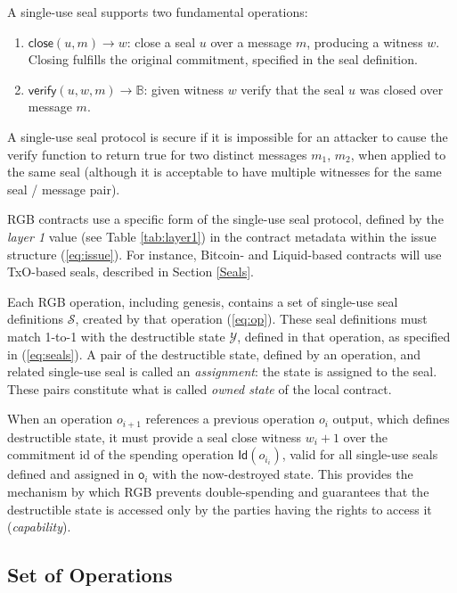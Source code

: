 \documentclass[9pt,oneside]{amsart}
\begin{document}
\begin{multicols}{2}
A single-use seal supports two fundamental operations:
\begin{enumerate}
    \item $\mathsf{close}(u,m) \rightarrow w$: close a seal $u$ over a message $m$, producing a witness $w$.
    Closing fulfills the original commitment, specified in the seal definition.
    \item $\mathsf{verify}(u,w,m) \rightarrow \mathbb{B}$: 
    given witness $w$ verify that the seal $u$ was closed over message $m$.
\end{enumerate}

A single-use seal protocol is secure if it is impossible for an attacker
to cause the \textsf{verify} function to return \textsf{true}
for two distinct messages $m_1$, $m_2$, when applied to the same seal
(although it is acceptable to have multiple witnesses for the same seal / message pair).

RGB contracts use a specific form of the single-use seal protocol,
defined by the \emph{layer 1} value (see Table \ref{tab:layer1})
in the contract metadata within the issue structure (\ref{eq:issue}).
For instance, Bitcoin- and Liquid-based contracts will use TxO-based seals,
described in Section \ref{Seals}.

Each RGB operation, including genesis, contains a set of single-use seal definitions $\mathcal{S}$,
created by that operation (\ref{eq:op}).
These seal definitions must match 1-to-1 with the destructible state $\mathcal{Y}$,
defined in that operation, as specified in (\ref{eq:seals}).
A pair of the destructible state, defined by an operation, and related single-use seal
is called an \emph{assignment}: the state is assigned to the seal.
These pairs constitute what is called \emph{owned state} of the local contract.

When an operation $o_{i+1}$ references a previous operation $o_i$ output,
which defines destructible state, it must provide a \gls{seal close witness} $w_i+1$
over the commitment id of the spending operation $\mathsf{Id}(o_{i_i})$,
valid for all single-use seals defined and assigned in $\mathsf{o}_i$
with the now-destroyed state.
This provides the mechanism by which RGB prevents double-spending
and guarantees that the destructible state is accessed only by the parties
having the rights to access it (\emph{capability}).

\subsection{Set of Operations}


\end{multicols}
\end{document}
